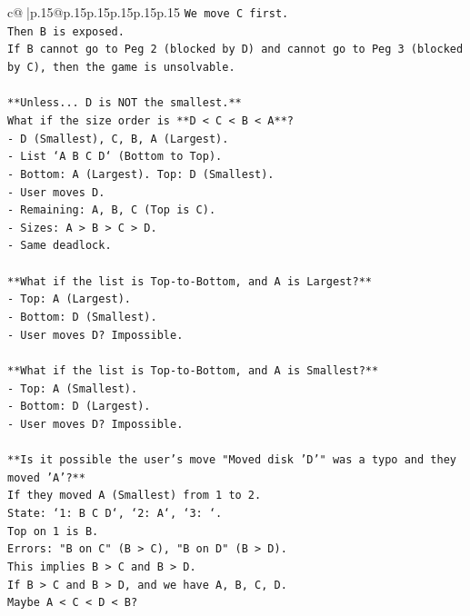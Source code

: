 \documentclass{article}
\begin{document}
{\begin{supertabular}{c@{$\;$}|p{.15\linewidth}@{}p{.15\linewidth}p{.15\linewidth}p{.15\linewidth}p{.15\linewidth}p{.15\linewidth}}
{{{\texttt{We move C first.} \\
\texttt{Then B is exposed.} \\
\texttt{If B cannot go to Peg 2 (blocked by D) and cannot go to Peg 3 (blocked by C), then the game is unsolvable.} \\
\\ 
\texttt{**Unless... D is NOT the smallest.**} \\
\texttt{What if the size order is **D < C < B < A**?} \\
\texttt{{-} D (Smallest), C, B, A (Largest).} \\
\texttt{{-} List `A B C D` (Bottom to Top).} \\
\texttt{{-} Bottom: A (Largest). Top: D (Smallest).} \\
\texttt{{-} User moves D.} \\
\texttt{{-} Remaining: A, B, C (Top is C).} \\
\texttt{{-} Sizes: A > B > C > D.} \\
\texttt{{-} Same deadlock.} \\
\\ 
\texttt{**What if the list is Top{-}to{-}Bottom, and A is Largest?**} \\
\texttt{{-} Top: A (Largest).} \\
\texttt{{-} Bottom: D (Smallest).} \\
\texttt{{-} User moves D? Impossible.} \\
\\ 
\texttt{**What if the list is Top{-}to{-}Bottom, and A is Smallest?**} \\
\texttt{{-} Top: A (Smallest).} \\
\texttt{{-} Bottom: D (Largest).} \\
\texttt{{-} User moves D? Impossible.} \\
\\ 
\texttt{**Is it possible the user's move "Moved disk 'D'" was a typo and they moved 'A'?**} \\
\texttt{If they moved A (Smallest) from 1 to 2.} \\
\texttt{State: `1: B C D`, `2: A`, `3: `.} \\
\texttt{Top on 1 is B.} \\
\texttt{Errors: "B on C" (B > C), "B on D" (B > D).} \\
\texttt{This implies B > C and B > D.} \\
\texttt{If B > C and B > D, and we have A, B, C, D.} \\
\texttt{Maybe A < C < D < B?} \\
}}}
\end{supertabular}}
\end{document}
